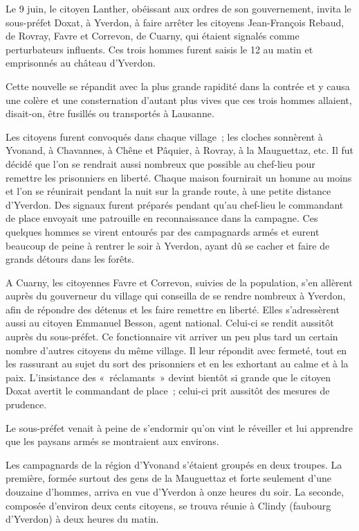 \documentclass[french,twoside]{book} %
\begin{document}
\noindent Le 9 juin, le citoyen Lanther, obéissant aux ordres de son gouvernement, invita le sous-préfet Doxat, à Yverdon, à faire arrêter les citoyens Jean-François Rebaud, de Rovray, Favre et Correvon, de Cuarny, qui étaient signalés comme perturbateurs influents. Ces trois hommes furent saisis le 12 au matin et emprisonnés au château d’Yverdon.\par
Cette nouvelle se répandit avec la plus grande rapidité dans la contrée et y causa une colère et une consternation d’autant plus vives que ces trois hommes allaient, disait-on, être fusillés ou transportés à Lausanne.\par
Les citoyens furent convoqués dans chaque village ; les cloches sonnèrent à Yvonand, à Chavannes, à Chêne et Pâquier, à Rovray, à la Mauguettaz, etc. Il fut décidé que l’on se rendrait aussi nombreux que possible au chef-lieu pour remettre les prisonniers en liberté. Chaque maison fournirait un homme au moins et l’on se réunirait pendant la nuit sur la grande route, à une petite distance d’Yverdon. Des signaux furent préparés pendant qu’au chef-lieu le commandant de place envoyait une patrouille en reconnaissance dans la campagne. Ces quelques hommes se virent entourés par des campagnards armés et eurent beaucoup de peine à rentrer le soir à Yverdon, ayant dû se cacher et faire de grands détours dans les forêts.\par
A Cuarny, les citoyennes Favre et Correvon, suivies de la population, s’en allèrent auprès du gouverneur du village qui conseilla de se rendre nombreux à Yverdon, afin de répondre des détenus et les faire remettre en liberté. Elles s’adressèrent aussi au citoyen Emmanuel Besson, agent national. Celui-ci se rendit aussitôt auprès du sous-préfet. Ce fonctionnaire vit arriver un peu plus tard un certain nombre d’autres citoyens du même village. Il leur répondit avec fermeté, tout en les rassurant au sujet du sort des prisonniers et en les exhortant au calme et à la paix. L’insistance des « réclamants » devint bientôt si grande que le citoyen Doxat avertit le commandant de place ; celui-ci prit aussitôt des mesures de prudence.\par
Le sous-préfet venait à peine de s’endormir qu’on vint le réveiller et lui apprendre que les paysans armés se montraient aux environs.\par
Les campagnards de la région d’Yvonand s’étaient groupés en deux troupes. La première, formée surtout des gens de la Mauguettaz et forte seulement d’une douzaine d’hommes, arriva en vue d’Yverdon à onze heures du soir. La seconde, composée d’environ deux cents citoyens, se trouva réunie à Clindy (faubourg d’Yverdon) à deux heures du matin.\par
\end{document}
